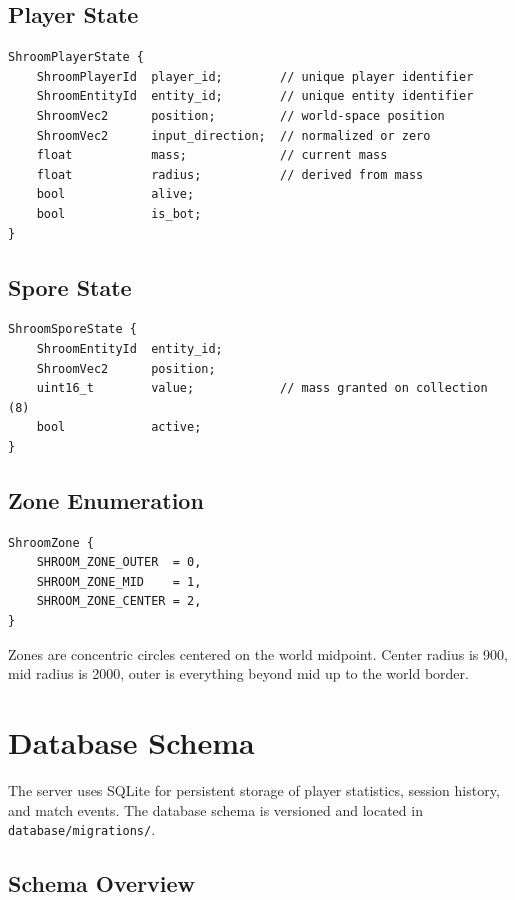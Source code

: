 \documentclass[11pt]{article}
\begin{document}
\subsection{Player State}

\begin{verbatim}
ShroomPlayerState {
    ShroomPlayerId  player_id;        // unique player identifier
    ShroomEntityId  entity_id;        // unique entity identifier
    ShroomVec2      position;         // world-space position
    ShroomVec2      input_direction;  // normalized or zero
    float           mass;             // current mass
    float           radius;           // derived from mass
    bool            alive;
    bool            is_bot;
}
\end{verbatim}

\subsection{Spore State}

\begin{verbatim}
ShroomSporeState {
    ShroomEntityId  entity_id;
    ShroomVec2      position;
    uint16_t        value;            // mass granted on collection (8)
    bool            active;
}
\end{verbatim}

\subsection{Zone Enumeration}

\begin{verbatim}
ShroomZone {
    SHROOM_ZONE_OUTER  = 0,
    SHROOM_ZONE_MID    = 1,
    SHROOM_ZONE_CENTER = 2,
}
\end{verbatim}

Zones are concentric circles centered on the world midpoint. Center radius is 900, mid radius is 2000, outer is everything beyond mid up to the world border.

\section{Database Schema}

The server uses SQLite for persistent storage of player statistics, session history, and match events. The database schema is versioned and located in \texttt{database/migrations/}.

\subsection{Schema Overview}
\end{document}
